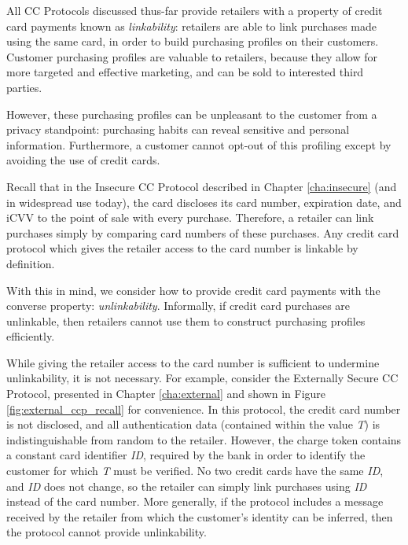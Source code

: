 All CC Protocols discussed thus-far provide retailers with a property of credit card payments known as \emph{linkability}:
    retailers are able to link purchases made using the same card, in order to build purchasing profiles on their customers.
Customer purchasing profiles are valuable to retailers, because they allow for more targeted and effective marketing, and can be sold to interested third parties.

However, these purchasing profiles can be unpleasant to the customer from a privacy standpoint:
  purchasing habits can reveal sensitive and personal information.
Furthermore, a customer cannot opt-out of this profiling except by avoiding the use of credit cards.

Recall that in the Insecure CC Protocol described in Chapter \ref{cha:insecure} (and in widespread use today),
  the card discloses its card number, expiration date, and iCVV to the point of sale with every purchase.
Therefore, a retailer can link purchases simply by comparing card numbers of these purchases.
Any credit card protocol which gives the retailer access to the card number is linkable by definition.

With this in mind, we consider how to provide credit card payments with the converse property: \emph{unlinkability}.
Informally, if credit card purchases are unlinkable, then retailers cannot use them to construct purchasing profiles efficiently.

While giving the retailer access to the card number is sufficient to undermine unlinkability, it is not necessary.
For example, consider the Externally Secure CC Protocol, presented in Chapter \ref{cha:external} and shown in Figure \ref{fig:external_ccp_recall} for convenience.
In this protocol, the credit card number is not disclosed, and all authentication data (contained within the value \emph{T}) is indistinguishable from random to the retailer.
However, the charge token contains a constant card identifier \emph{ID}, required by the bank in order to identify the customer for which \emph{T} must be verified.
No two credit cards have the same \emph{ID}, and \emph{ID} does not change, so the retailer can simply link purchases using \emph{ID} instead of the card number.
More generally, if the protocol includes a message received by the retailer from which the customer's identity can be inferred, then the protocol cannot provide unlinkability.

